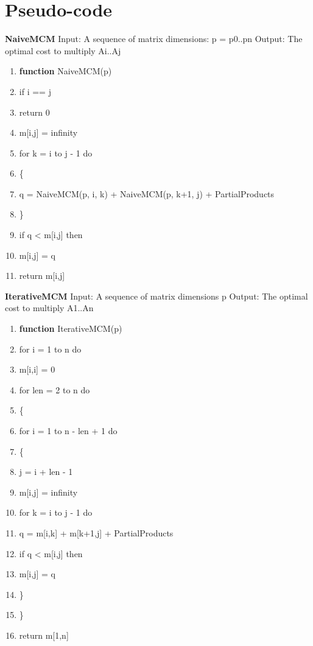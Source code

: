 \documentclass[conference]{IEEEtran}
\begin{document}
\section{Pseudo-code}

\textbf{NaiveMCM}
\newline
Input: A sequence of matrix dimensions: p = p0..pn
Output: The optimal cost to multiply Ai..Aj

\begingroup
\renewcommand\labelenumi{\theenumi:}
\begin{enumerate}
\item \textbf{function} NaiveMCM(p)  \label{item:1}
\item if i == j \label{item:2}
\item return 0 \label{item:3}
\item m[i,j] = infinity \label{item:4}
\item for k = i to j - 1 do \label{item:3}
\item \{ \label{item:4}
\item \indent q = NaiveMCM(p, i, k) + NaiveMCM(p, k+1, j) + PartialProducts\label{item:5}
\item \indent \} \label{item:7}
\item \indent if q < m[i,j] then \label{item:7}
\item \indent m[i,j] = q \label{item:8}
\item \indent return m[i,j] \label{item:8}
\end{enumerate}
\endgroup

\textbf{IterativeMCM}
\newline
Input: A sequence of matrix dimensions p
Output: The optimal cost to multiply A1..An

\begingroup
\renewcommand\labelenumi{\theenumi:}
\begin{enumerate}
\item \textbf{function} IterativeMCM(p)  \label{item:1}
\item for i = 1 to n do \label{item:2}
\item m[i,i] = 0 \label{item:3}
\item for len = 2 to n do \label{item:4}
\item \{ \label{item:4}
\item for i = 1 to n - len + 1 do \label{item:4}
\item \{ \label{item:4}
\item j = i + len - 1 \label{item:4}
\item m[i,j] = infinity \label{item:4}
\item for k = i to j - 1 do\label{item:4}
\item q = m[i,k] + m[k+1,j] + PartialProducts \label{item:4}
\item if q < m[i,j] then \label{item:4}
\item m[i,j] = q \label{item:4}
\item \} \label{item:4}
\item \} \label{item:4}
\item return m[1,n] \label{item:4}
\end{enumerate}
\endgroup
\end{document}
